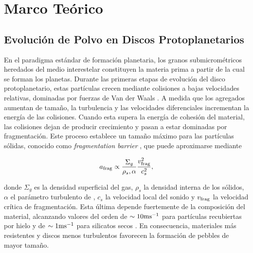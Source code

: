 
\chapter{Marco Teórico}
\label{cap:marco_teorico}

\section{Evolución de Polvo en Discos Protoplanetarios}


En el paradigma estándar de formación planetaria, los granos submicrométricos heredados del medio interestelar constituyen la materia prima a partir de la cual se forman los planetas. Durante las primeras etapas de evolución del disco protoplanetario, estas partículas crecen mediante colisiones a bajas velocidades relativas, dominadas por fuerzas de Van der Waals \citep{Dominik1997,Blum2018}. A medida que los agregados aumentan de tamaño, la turbulencia y las velocidades diferenciales incrementan la energía de las colisiones. Cuando esta supera la energía de cohesión del material, las colisiones dejan de producir crecimiento y pasan a estar dominadas por fragmentación. Este proceso establece un tamaño máximo para las partículas sólidas, conocido como \textit{fragmentation barrier} \citep{Birnstiel2012, Blum2018, Drazkowska2023}, que puede aproximarse mediante

\begin{equation}
a_{\rm frag} \propto
\frac{\Sigma_g}{\rho_s,\alpha}
\frac{v_{\rm frag}^2}{c_s^2},
\end{equation}

donde $\Sigma_g$ es la densidad superficial del gas, $\rho_s$ la densidad interna de los sólidos, $\alpha$ el parámetro turbulento de \citet{Shakura_sunyaev_1973}, $c_s$ la velocidad local del sonido y $v_{\rm frag}$ la velocidad crítica de fragmentación. Esta última depende fuertemente de la composición del material, alcanzando valores del orden de $\sim10{\rm ms^{-1}}$ para partículas recubiertas por hielo \citep{Gundlach_2014} y de $\sim1{\rm ms^{-1}}$ para silicatos secos \citep{Blum2018, Musiolik_Grzegorz_Gerhard2019}. En consecuencia, materiales más resistentes y discos menos turbulentos favorecen la formación de pebbles de mayor tamaño.

